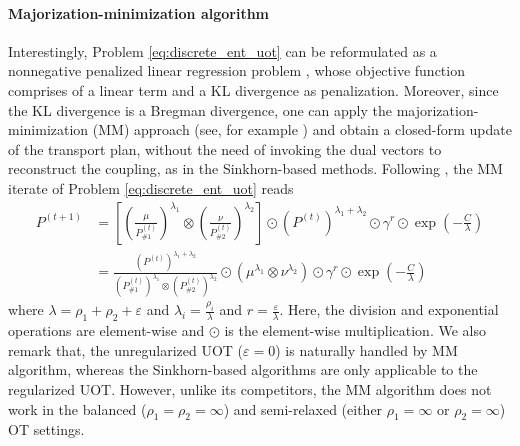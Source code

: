 \paragraph{Majorization-minimization algorithm} Interestingly, Problem \ref{eq:discrete_ent_uot}
can be reformulated as a nonnegative penalized linear regression problem \citep{Chapel21},
whose objective function comprises of a linear term and a KL divergence as penalization.
Moreover, since the KL divergence is a Bregman divergence, one can apply the
majorization-minimization (MM) approach (see, for example \citep{Hunter04,Sun17}) and obtain
a closed-form update of the transport plan, without the need of invoking the dual vectors
to reconstruct the coupling, as in the Sinkhorn-based methods. Following \citep{Chapel21},
the MM iterate of Problem \ref{eq:discrete_ent_uot} reads
\begin{align}
    P^{(t+1)} &= \left[ \left( \frac{\mu}{P^{(t)}_{\# 1}}\right)^{\lambda_1} \otimes
    \left( \frac{\nu}{P^{(t)}_{\# 2}}\right)^{\lambda_2} \right] \odot
    (P^{(t)})^{\lambda_1 + \lambda_2} \odot \gamma^r \odot \exp\left(-\frac{C}{\lambda} \right) \\
    &= \frac{(P^{(t)})^{\lambda_1 + \lambda_2}}{(P^{(t)}_{\# 1})^{\lambda_1} \otimes (P^{(t)}_{\# 2})^{\lambda_2}}
    \odot \left( \mu^{\lambda_1} \otimes \nu^{\lambda_2} \right) \odot \gamma^r
    \odot \exp\left(-\frac{C}{\lambda} \right)
\end{align}
where $\lambda = \rho_1 + \rho_2 + \varepsilon$ and
$\lambda_i = \frac{\rho_i}{\lambda}$ and $r = \frac{\varepsilon}{\lambda}$.
Here, the division and exponential operations are element-wise and
$\odot$ is the element-wise multiplication. We also remark that,
the unregularized UOT ($\varepsilon = 0$) is naturally handled by MM algorithm,
whereas the Sinkhorn-based algorithms are only applicable to the regularized UOT. However,
unlike its competitors, the MM algorithm does not work in the balanced ($\rho_1=\rho_2=\infty$)
and semi-relaxed (either $\rho_1=\infty$ or $\rho_2=\infty$) OT settings.

